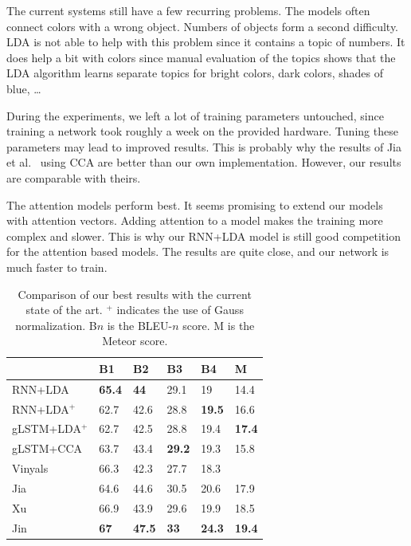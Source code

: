 \documentclass[twoside,twocolumn]{article}
\begin{document}
	The current systems still have a few recurring problems. The models often connect colors with a wrong object. Numbers of objects form a second difficulty. LDA is not able to help with this problem since it contains a topic of numbers. It does help a bit with colors since manual evaluation of the topics shows that the LDA algorithm learns separate topics for bright colors, dark colors, shades of blue, \ldots
	
	During the experiments, we left a lot of training parameters untouched, since training a network took roughly a week on the provided hardware. Tuning these parameters may lead to improved results. This is probably why the results of Jia et al.~\cite{Fernando2015} using CCA are better than our own implementation. However, our results are comparable with theirs. 
	
	The attention models perform best. It seems promising to extend our models with attention vectors. Adding attention to a model makes the training more complex and slower. This is why our RNN+LDA model is still good competition for the attention based models. The results are quite close, and our network is much faster to train. 
	
	\begin{table}
		\centering
		\begin{tabular}{llllll}
			~                  & B1 & B2 & B3 & B4 & M \\ \hline
			RNN+LDA            & \textbf{65.4}   & \textbf{44}     & 29.1   & 19     & 14.4  \\
			RNN+LDA$^+$      & 62.7   & 42.6   & 28.8   & \textbf{19.5}   & 16.6  \\
			gLSTM+LDA$^+$    & 62.7   & 42.5   & 28.8   & 19.4   & \textbf{17.4}   \\
			gLSTM+CCA          & 63.7   & 43.4   & \textbf{29.2}   & 19.3   & 15.8  \\ \hline
			Vinyals~\cite{Google}           & 66.3   & 42.3   & 27.7   & 18.3   & ~      \\
			Jia~\cite{Fernando2015}  & 64.6   & 44.6   & 30.5   & 20.6   & 17.9  \\
			Xu~\cite{Xu2015}     & 66.9   & 43.9   & 29.6   & 19.9   & 18.5  \\
			Jin~\cite{Jin2015}      & \textbf{67}    & \textbf{47.5}   & \textbf{33}     & \textbf{24.3}   & \textbf{19.4}   \\ \hline
		\end{tabular}
		\caption{Comparison of our best results with the current state of the art. $^+$ indicates the use of Gauss normalization. B$n$ is the BLEU-$n$ score. M is the Meteor score.}
		\label{tab:sota}
	\end{table}
	
\end{document}
